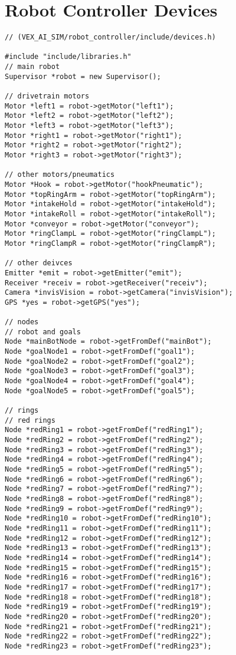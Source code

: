 \section*{Robot Controller Devices}
\begin{verbatim}
// (VEX_AI_SIM/robot_controller/include/devices.h)
 
#include "include/libraries.h"
// main robot
Supervisor *robot = new Supervisor();
 
// drivetrain motors
Motor *left1 = robot->getMotor("left1");
Motor *left2 = robot->getMotor("left2");
Motor *left3 = robot->getMotor("left3");
Motor *right1 = robot->getMotor("right1");
Motor *right2 = robot->getMotor("right2");
Motor *right3 = robot->getMotor("right3");
 
// other motors/pneumatics
Motor *Hook = robot->getMotor("hookPneumatic");
Motor *topRingArm = robot->getMotor("topRingArm");
Motor *intakeHold = robot->getMotor("intakeHold");
Motor *intakeRoll = robot->getMotor("intakeRoll");
Motor *conveyor = robot->getMotor("conveyor");
Motor *ringClampL = robot->getMotor("ringClampL");
Motor *ringClampR = robot->getMotor("ringClampR");
 
// other deivces
Emitter *emit = robot->getEmitter("emit");
Receiver *receiv = robot->getReceiver("receiv");
Camera *invisVision = robot->getCamera("invisVision");
GPS *yes = robot->getGPS("yes");
 
// nodes
// robot and goals
Node *mainBotNode = robot->getFromDef("mainBot");
Node *goalNode1 = robot->getFromDef("goal1");
Node *goalNode2 = robot->getFromDef("goal2");
Node *goalNode3 = robot->getFromDef("goal3");
Node *goalNode4 = robot->getFromDef("goal4");
Node *goalNode5 = robot->getFromDef("goal5");
 
// rings
// red rings
Node *redRing1 = robot->getFromDef("redRing1");
Node *redRing2 = robot->getFromDef("redRing2");
Node *redRing3 = robot->getFromDef("redRing3");
Node *redRing4 = robot->getFromDef("redRing4");
Node *redRing5 = robot->getFromDef("redRing5");
Node *redRing6 = robot->getFromDef("redRing6");
Node *redRing7 = robot->getFromDef("redRing7");
Node *redRing8 = robot->getFromDef("redRing8");
Node *redRing9 = robot->getFromDef("redRing9");
Node *redRing10 = robot->getFromDef("redRing10");
Node *redRing11 = robot->getFromDef("redRing11");
Node *redRing12 = robot->getFromDef("redRing12");
Node *redRing13 = robot->getFromDef("redRing13");
Node *redRing14 = robot->getFromDef("redRing14");
Node *redRing15 = robot->getFromDef("redRing15");
Node *redRing16 = robot->getFromDef("redRing16");
Node *redRing17 = robot->getFromDef("redRing17");
Node *redRing18 = robot->getFromDef("redRing18");
Node *redRing19 = robot->getFromDef("redRing19");
Node *redRing20 = robot->getFromDef("redRing20");
Node *redRing21 = robot->getFromDef("redRing21");
Node *redRing22 = robot->getFromDef("redRing22");
Node *redRing23 = robot->getFromDef("redRing23");
 

\end{verbatim}
